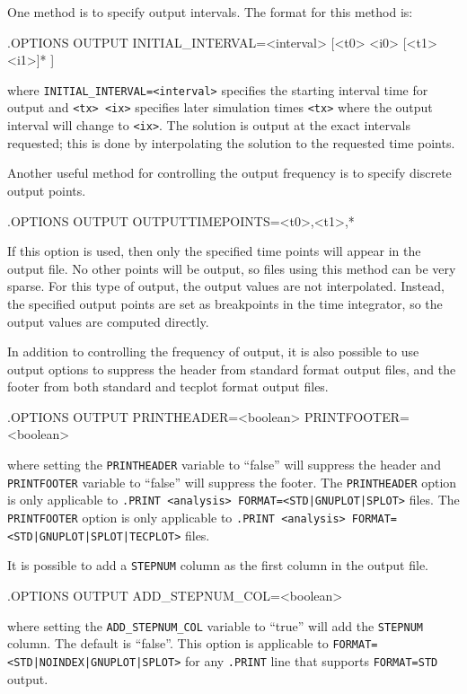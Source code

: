 One method is to specify output intervals.  The format for this method is:
\begin{vquote}
.OPTIONS OUTPUT INITIAL_INTERVAL=<interval> [<t0> <i0> [<t1> <i1>]* ]
\end{vquote}
where \verb+INITIAL_INTERVAL=<interval>+ specifies the starting interval time
for output and \verb+<tx> <ix>+ specifies later simulation times \verb+<tx>+
where the output interval will change to \verb+<ix>+. The solution is output at the
exact intervals requested; this is done by interpolating the solution
to the requested time points.

Another useful method for controlling the output frequency is to specify discrete output
points.  
\begin{vquote}
.OPTIONS OUTPUT OUTPUTTIMEPOINTS=<t0>,<t1>,* 
\end{vquote}
If this option is used, then only the specified time points will appear in the output file.
No other points will be output, so files using this method can be very sparse.  For this type
of output, the output values are not interpolated.  Instead, the specified output points are 
set as breakpoints in the time integrator, so the output values are computed directly.

In addition to controlling the frequency of output, it is also possible to use
output options to suppress the header from standard format output files, and the footer
from both standard and tecplot format output files.
\begin{vquote}
.OPTIONS OUTPUT PRINTHEADER=<boolean> PRINTFOOTER=<boolean>
\end{vquote}
where setting the \texttt{PRINTHEADER} variable to ``false'' will suppress the header and 
\texttt{PRINTFOOTER} variable to ``false'' will suppress the footer.  The \texttt{PRINTHEADER}
option is only applicable to \texttt{.PRINT <analysis> FORMAT=<STD|GNUPLOT|SPLOT>} files.
The \texttt{PRINTFOOTER} option is only applicable to
\texttt{.PRINT <analysis> FORMAT=<STD|GNUPLOT|SPLOT|TECPLOT>} files.

It is possible to add a \texttt{STEPNUM} column as the first column in the output file.
\begin{vquote}
.OPTIONS OUTPUT ADD\_STEPNUM\_COL=<boolean>
\end{vquote}
where setting the \texttt{ADD\_STEPNUM\_COL} variable to ``true'' will add the
\texttt{STEPNUM} column.  The default is ``false''. This option is applicable to
\texttt{FORMAT=<STD|NOINDEX|GNUPLOT|SPLOT>} for any \texttt{.PRINT} line that
supports \texttt{FORMAT=STD} output.


